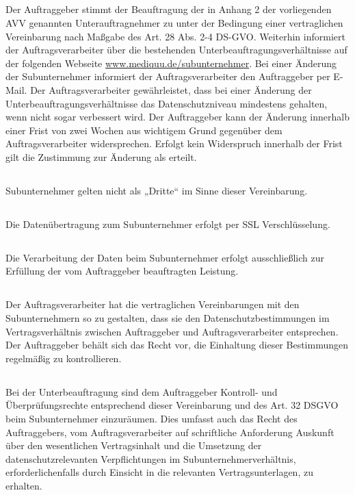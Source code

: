 \documentclass[10pt]{article}
\begin{document}
\subsection{} Der Auftraggeber stimmt der Beauftragung der in Anhang 2 der vorliegenden AVV
genannten Unterauftragnehmer zu unter der Bedingung einer
vertraglichen Vereinbarung nach Maßgabe des Art. 28 Abs. 2-4 DS-GVO. Weiterhin
informiert der Auftragsverarbeiter über die bestehenden
Unterbeauftragungsverhältnisse auf der folgenden Webseite
\href{https://www.mediquu.de/subunternehmer}{www.mediquu.de/subunternehmer}. Bei einer Änderung der Subunternehmer
informiert der Auftragsverarbeiter den Auftraggeber per E-Mail. Der
Auftragsverarbeiter gewährleistet, dass bei einer Änderung der
Unterbeauftragungsverhältnisse das Datenschutzniveau mindestens gehalten, wenn
nicht sogar verbessert wird. Der Auftraggeber kann der Änderung innerhalb einer
Frist von zwei Wochen aus wichtigem Grund gegenüber dem Auftragsverarbeiter
widersprechen. Erfolgt kein Widerspruch innerhalb der Frist gilt die Zustimmung zur
Änderung als erteilt.
\subsection{} Subunternehmer gelten nicht als „Dritte“ im Sinne dieser Vereinbarung.
\subsection{} Die Datenübertragung zum Subunternehmer erfolgt per SSL Verschlüsselung.
\subsection{} Die Verarbeitung der Daten beim Subunternehmer erfolgt ausschließlich zur
Erfüllung der vom Auftraggeber beauftragten Leistung.
\subsection{} Der Auftragsverarbeiter hat die vertraglichen Vereinbarungen mit den
Subunternehmern so zu gestalten, dass sie den Datenschutzbestimmungen im
Vertragsverhältnis zwischen Auftraggeber und Auftragsverarbeiter entsprechen. Der
Auftraggeber behält sich das Recht vor, die Einhaltung dieser Bestimmungen
regelmäßig zu kontrollieren.\subsection{} Bei der Unterbeauftragung sind dem Auftraggeber Kontroll- und Überprüfungsrechte
entsprechend dieser Vereinbarung und des Art. 32 DSGVO beim Subunternehmer
einzuräumen. Dies umfasst auch das Recht des Auftraggebers, vom
Auftragsverarbeiter auf schriftliche Anforderung Auskunft über den wesentlichen
Vertragsinhalt und die Umsetzung der datenschutzrelevanten Verpflichtungen im
Subunternehmerverhältnis, erforderlichenfalls durch Einsicht in die relevanten
Vertragsunterlagen, zu erhalten.
\end{document}
